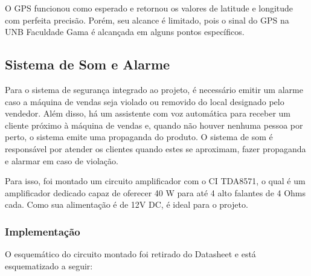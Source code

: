 O GPS funcionou como esperado e retornou os valores de latitude e longitude com perfeita precisão. Porém, seu alcance é limitado, pois o sinal do GPS na UNB Faculdade Gama é alcançada em alguns pontos específicos.  

\subsection{Sistema de Som e Alarme}

Para o sistema de segurança integrado ao projeto, é necessário emitir um alarme caso a máquina de vendas seja violado ou removido do local designado pelo vendedor. Além disso, há um assistente com voz automática para receber um cliente próximo à máquina de vendas e, quando não houver nenhuma pessoa por perto, o sistema emite uma propaganda do produto. O sistema de som é responsável por atender os clientes quando estes se aproximam, fazer propaganda e alarmar em caso de violação.

Para isso, foi montado um circuito amplificador com o CI TDA8571, o qual é um amplificador dedicado capaz de oferecer 40 W para até 4 alto falantes de 4 Ohms cada. Como sua alimentação é de 12V DC, é ideal para o projeto.

\subsubsection{Implementação}

O esquemático do circuito montado foi retirado do Datasheet \cite{mq2} e está esquematizado a seguir:

